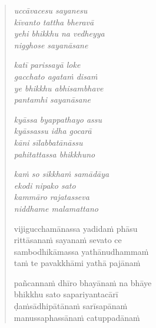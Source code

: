 \clearpage
\begin{verse}

\emph{uccāvacesu sayanesu\\
kīvanto tattha bheravā}\\
\emph{yehi bhikkhu na vedheyya\\
nigghose sayanāsane}

\emph{katī parissayā loke\\
gacchato agataṁ disaṁ}\\
\emph{ye bhikkhu abhisambhave\\
pantamhi sayanāsane}

\emph{kyāssa byappathayo assu\\
kyāssassu idha gocarā}\\
\emph{kāni sīlabbatānāssu\\
pahitattassa bhikkhuno}

\emph{kaṁ so sikkhaṁ samādāya\\
ekodi nipako sato}\\
\emph{kammāro rajatasseva\\
niddhame malamattano}

vijigucchamānassa yadidaṁ phāsu\\
rittāsanaṁ sayanaṁ sevato ce\\
sambodhikāmassa yathānudhammaṁ\\
taṁ te pavakkhāmi yathā pajānaṁ

pañcannaṁ dhīro bhayānaṁ na bhāye\\
bhikkhu sato sapariyantacārī\\
ḍaṁsādhipātānaṁ sarīsapānaṁ\\
manussaphassānaṁ catuppadānaṁ

\end{verse}



